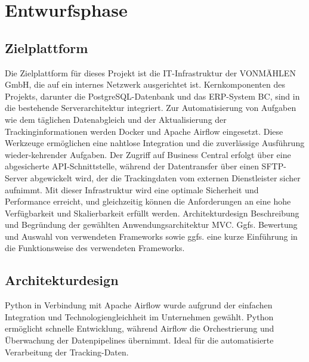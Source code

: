 \section{Entwurfsphase} 
\label{sec:Entwurfsphase}

\subsection{Zielplattform}
\label{sec:Zielplattform} 
Die Zielplattform für dieses Projekt ist die IT-Infrastruktur der VONMÄHLEN GmbH, die auf ein internes Netzwerk 
ausgerichtet ist. Kernkomponenten des Projekts, darunter die PostgreSQL-Datenbank und das \ac{ERP}-System BC, sind in 
die bestehende Serverarchitektur integriert. Zur Automatisierung von Aufgaben wie dem täglichen Datenabgleich und 
der Aktualisierung der Trackinginformationen werden Docker und Apache Airflow eingesetzt. Diese Werkzeuge ermöglichen 
eine nahtlose Integration und die zuverlässige Ausführung wieder-kehrender Aufgaben. Der Zugriff auf Business Central 
erfolgt über eine abgesicherte \ac{API}-Schnittstelle, während der Datentransfer über einen SFTP-Server abgewickelt wird, 
der die Trackingdaten vom externen Dienstleister sicher aufnimmt. Mit dieser Infrastruktur wird eine optimale Sicherheit 
und Performance erreicht, und gleichzeitig können die Anforderungen an eine hohe Verfügbarkeit und Skalierbarkeit erfüllt 
werden. Architekturdesign Beschreibung und Begründung der gewählten Anwendungsarchitektur \ac{MVC}. Ggfs. Bewertung und 
Auswahl von verwendeten Frameworks sowie ggfs. eine kurze Einführung in die Funktionsweise des verwendeten Frameworks.

\subsection{Architekturdesign}
\label{sec:Architekturdesign}
Python in Verbindung mit Apache Airflow wurde aufgrund der einfachen Integration und Technologiengleichheit im Unternehmen gewählt. 
Python ermöglicht schnelle Entwicklung, während Airflow die Orchestrierung und Überwachung der Datenpipelines übernimmt. Ideal für 
die automatisierte Verarbeitung der Tracking-Daten.

